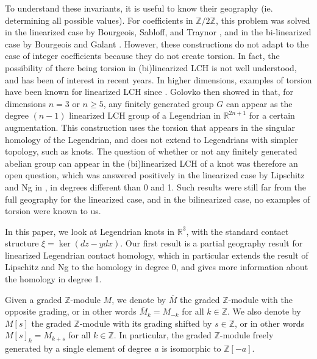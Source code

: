 \documentclass[11pt]{amsart}
\theoremstyle{plain}
\theoremstyle{remark}
\numberwithin{equation}{section}
\newcommand{\R}{\ensuremath{\mathbb{R}}}
\newcommand{\Z}{\ensuremath{\mathbb{Z}}}
\begin{document}
To understand these invariants, it is useful to know their geography (ie. determining all possible values). For coefficients in $\Z/2\Z$, this problem was solved in the linearized case by Bourgeois, Sabloff, and Traynor \cite{BST}, and in the bi-linearized case by Bourgeois and Galant \cite{BG}. However, these constructions do not adapt to the case of integer coefficients because they do not create torsion. In fact, the possibility of there being torsion in (bi)linearized LCH is not well understood, and has been of interest in recent years. In higher dimensions, examples of torsion have been known for linearized LCH since \cite{EES05}. Golovko then showed in \cite{G} that, for dimensions $n=3$ or $n\geq 5$, any finitely generated group $G$ can appear as the degree $(n-1)$ linearized LCH group of a Legendrian in $\R^{2n+1}$ for a certain augmentation. This construction uses the torsion that appears in the singular homology of the Legendrian, and does not extend to Legendrians with simpler topology, such as knots. The question of whether or not any finitely generated abelian group can appear in the (bi)linearized LCH of a knot was therefore an open question, which was answered positively in the linearized case by Lipschitz and Ng in \cite{LN}, in degrees different than 0 and 1. Such results were still far from the full geography for the linearized case, and in the bilinearized case, no examples of torsion were known to us. 

In this paper, we look at Legendrian knots in $\mathbb{R}^3$, with the standard contact structure $\xi = \ker(dz-ydx)$. Our first result is a partial geography result for linearized Legendrian contact homology, which in particular extends the result of Lipschitz and Ng to the homology in degree 0, and gives more information about the homology in degree 1. 

Given a graded $\Z$-module $M$, we denote by $\overline{M}$ the graded $\Z$-module with the opposite grading, or
in other words $\overline{M}_k = M_{-k}$ for all $k \in \Z$. We also denote by $M[s]$ the graded $\Z$-module with its grading 
shifted by $s \in \Z$, or in other words $M[s]_k = M_{k+s}$ for all $k \in \Z$. In particular, the graded $\Z$-module freely generated
by a single element of degree $a$ is isomorphic to $\Z[-a]$.
\end{document}

